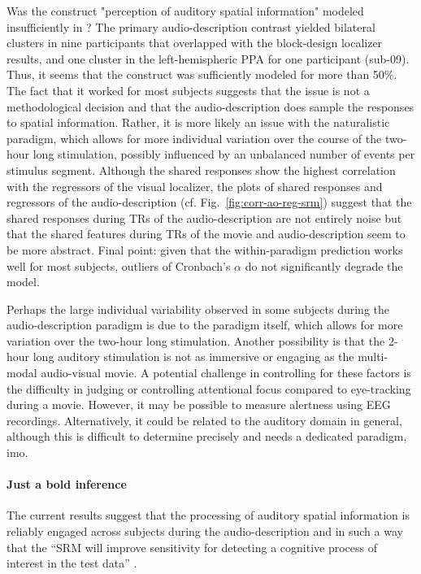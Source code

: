 %
Was the construct "perception of auditory spatial information" modeled
insufficiently in \citet{haeusler2022processing}?
%
The primary audio-description contrast yielded bilateral clusters in nine
participants that overlapped with the block-design localizer results, and one
cluster in the left-hemispheric PPA for one participant (sub-09). Thus, it seems
that the construct was sufficiently modeled for more than 50\%.
%
The fact that it worked for most subjects suggests that the issue is not a
methodological decision and that the audio-description does sample the responses
to spatial information.
%
Rather, it is more likely an issue with the naturalistic paradigm, which allows
for more individual variation over the course of the two-hour long stimulation,
possibly influenced by an unbalanced number of events per stimulus segment.
%
Although the shared responses show the highest correlation with the regressors
of the visual localizer, the plots of shared responses and regressors of the
audio-description (cf. Fig.~\ref{fig:corr-ao-reg-srm}) suggest that the shared
responses during TRs of the audio-description are not entirely noise but that
the shared features during TRs of the movie and audio-description seem to be
more abstract.
%
Final point: given that the within-paradigm prediction works well for most
subjects, outliers of Cronbach's $\alpha$ do not significantly degrade the
model.

%
Perhaps the large individual variability observed in some subjects during the
audio-description paradigm is due to the paradigm itself, which allows for more
variation over the two-hour long stimulation.
%
Another possibility is that the 2-hour long auditory stimulation is not as
immersive or engaging as the multi-modal audio-visual movie.
%
A potential challenge in controlling for these factors is the difficulty in
judging or controlling attentional focus compared to eye-tracking during a
movie.
%
However, it may be possible to measure alertness using EEG recordings.
%
Alternatively, it could be related to the auditory domain in general, although
this is difficult to determine precisely and needs a dedicated paradigm, imo.


\paragraph{Just a bold inference}

%
The current results suggest that the processing of auditory spatial information
is reliably engaged across subjects during the audio-description and in such a
way that the ``SRM will improve sensitivity for detecting a cognitive process of
interest in the test data'' \citep{cohen2017computational}.

